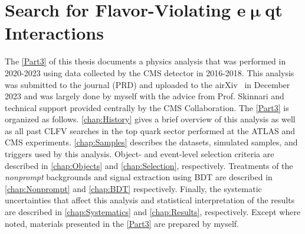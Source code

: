 \part{Search for Flavor-Violating e$\bm{\upmu}$qt Interactions}
\label{Part3}
The \autoref{Part3} of this thesis documents a physics analysis that was performed in 2020-2023 using data collected by the \ac{CMS} detector in 2016-2018. This analysis was submitted to the journal (PRD) and uploaded to the airXiv~\cite{CMS:2023phe} in December 2023 and was largely done by myself with the advice from Prof. Skinnari and technical support provided centrally by the \ac{CMS} Collaboration. The \autoref{Part3} is organized as follows. \autoref{chap:History} gives a brief overview of this analysis as well as all past \ac{CLFV} searches in the top quark sector performed at the \ac{ATLAS} and \ac{CMS} experiments. \autoref{chap:Samples} describes the datasets, simulated samples, and triggers used by this analysis. Object- and event-level selection criteria are described in \autoref{chap:Objects} and \autoref{chap:Selection}, respectively. Treatments of the \emph{nonprompt} backgrounds and signal extraction using \ac{BDT} are described in \autoref{chap:Nonprompt} and \autoref{chap:BDT} respectively. Finally, the systematic uncertainties that affect this analysis and statistical interpretation of the results are described in \autoref{chap:Systematics} and \autoref{chap:Results}, respectively. Except where noted, materials presented in the \autoref{Part3} are prepared by myself.







